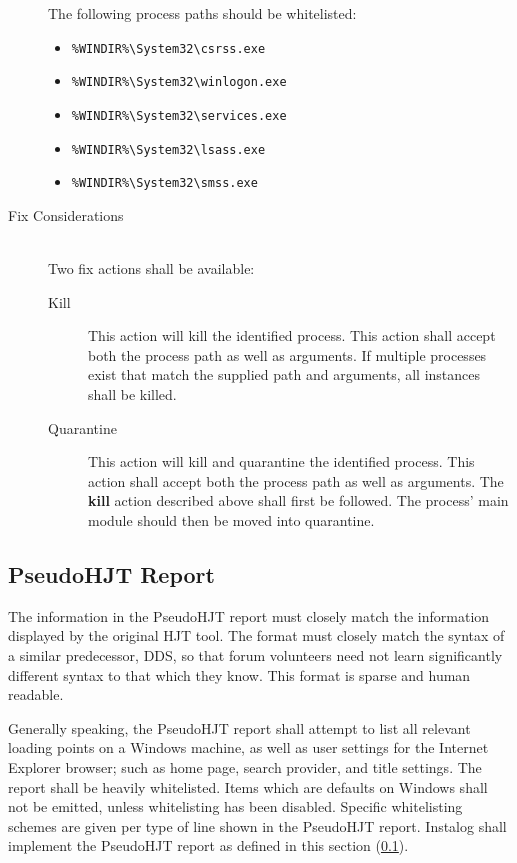 \begin{description}
The following process paths should be whitelisted:
\begin{itemize}
  \item \verb|%WINDIR%\System32\csrss.exe|
  \item \verb|%WINDIR%\System32\winlogon.exe|
  \item \verb|%WINDIR%\System32\services.exe|
  \item \verb|%WINDIR%\System32\lsass.exe|
  \item \verb|%WINDIR%\System32\smss.exe|
\end{itemize}
\item[Fix Considerations] \hfill \\
Two fix actions shall be available:
\begin{description}
\item[Kill] This action will kill the identified process.  This action shall
accept both the process path as well as arguments.  If multiple processes exist
that match the supplied path and arguments, all instances shall be killed. 
\item[Quarantine]  This action will kill and quarantine the identified
process.  This action shall accept both the process path as well as arguments. 
The \textbf{kill} action described above shall first be followed.  The process'
main module should then be moved into quarantine.
\end{description}
\end{description}

\subsection{PseudoHJT Report} \label{hjtgeneral}
The information in the PseudoHJT report must closely match the information
displayed by the original HJT tool. The format must closely match the syntax of
a similar predecessor, DDS, so that forum volunteers need not learn
significantly different syntax to that which they know. This format is
sparse and human readable. 

Generally speaking, the PseudoHJT report shall attempt to list all relevant
loading points on a Windows machine, as well as user settings for the Internet
Explorer browser; such as home page, search provider, and title settings. The
report shall be heavily whitelisted. Items which are defaults on Windows shall
not be emitted, unless whitelisting has been disabled. Specific whitelisting
schemes are given per type of line shown in the PseudoHJT report. Instalog shall
implement the PseudoHJT report as defined in this section (\ref{hjtgeneral}).


